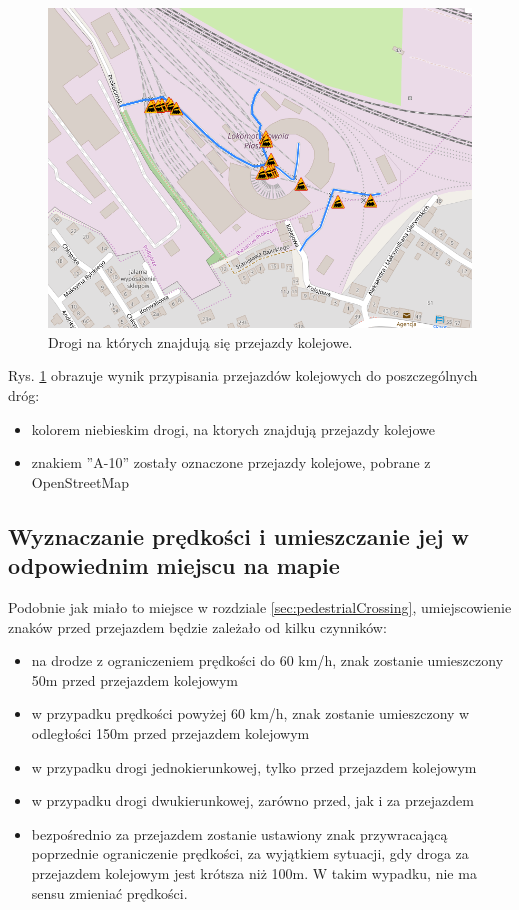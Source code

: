 \begin{figure}[h]
\caption{Drogi na których znajdują się przejazdy kolejowe.}
\label{sec:PrzejazdyKolejowe}
\centering
\includegraphics[width=1.0\textwidth]{railCrossing}
\end{figure}

Rys. \ref{sec:PrzejazdyKolejowe} obrazuje wynik przypisania przejazdów kolejowych do poszczególnych dróg:
\begin{itemize}
\item kolorem niebieskim drogi, na ktorych znajdują przejazdy kolejowe
\item znakiem ''A-10'' zostały oznaczone przejazdy kolejowe, pobrane z OpenStreetMap
\end{itemize}

\newpage
\subsection{Wyznaczanie prędkości i umieszczanie jej w odpowiednim miejscu na mapie}

Podobnie jak miało to miejsce w rozdziale \ref{sec:pedestrialCrossing}, umiejscowienie znaków przed przejazdem będzie zależało od kilku czynników:
\begin{itemize}
\item na  drodze z ograniczeniem prędkości do 60 km/h, znak zostanie umieszczony 50m przed przejazdem kolejowym
\item w przypadku prędkości powyżej 60 km/h, znak zostanie umieszczony w odległości 150m przed przejazdem kolejowym
\item w przypadku drogi jednokierunkowej, tylko przed przejazdem kolejowym
\item w przypadku drogi dwukierunkowej, zarówno przed, jak i za przejazdem
\item bezpośrednio za przejazdem zostanie ustawiony znak przywracającą poprzednie ograniczenie prędkości, za wyjątkiem sytuacji, gdy droga za przejazdem kolejowym jest krótsza niż 100m. W takim wypadku, nie ma sensu zmieniać prędkości. 
\end{itemize}

